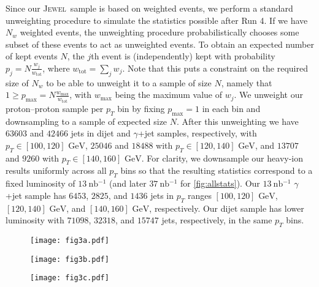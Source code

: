 \documentclass[aps,prl,twocolumn,preprintnumbers,showpacs,floatfix,nofootinbib]{revtex4-1}
\newcommand*{\jewel}{\textsc{Jewel}}
\begin{document}
Since our \jewel\ sample is based on weighted events, we perform a standard unweighting procedure to simulate the statistics possible after Run 4.
%
If we have $N_w$ weighted events, the unweighting procedure probabilistically chooses some subset of these events to act as unweighted events.
%
To obtain an expected number of kept events $N$, the $j$th event is (independently) kept with probability $p_j = N \frac{w_j}{w_\text{tot}}$, where $w_\text{tot} = \sum_j w_j$.
%
Note that this puts a constraint on the required size of $N_w$ to be able to unweight it to a sample of size $N$, namely that $1 \ge p_\text{max} = N \frac{w_\text{max}}{w_\text{tot}}$, with $w_\text{max}$ being the maximum value of $w_j$.
%
We unweight our proton--proton sample per $p_T$ bin by fixing $p_\text{max}=1$ in each bin and downsampling to a sample of expected size $N$.
%
After this unweighting we have $63603$ and $42466$ jets in dijet and $\gamma$+jet samples, respectively, with $p_T \in [100,120] \text{ GeV}$, $25046$ and $18488$ with $p_T \in [120,140] \text{ GeV}$, and $13707$ and $9260$ with $p_T \in [140,160] \text{ GeV}$.
%
For clarity, we downsample our heavy-ion results uniformly across all $p_T$ bins so that the resulting statistics correspond to a fixed luminosity of $\SI{13}{\nano\barn^{-1}}$ (and later $\SI{37}{\nano\barn^{-1}}$ for \cref{fig:allstats}).
%
Our $\SI{13}{\nano\barn^{-1}}$ $\gamma$+jet sample has $6453$, $2825$, and $1436$ jets in $p_T$ ranges $[100,120] \text{ GeV}$, $[120,140] \text{ GeV}$, and $[140,160] \text{ GeV}$, respectively.
%
Our dijet sample has lower luminosity with $71098$, $32318$, and $15747$ jets, respectively, in the same $p_T$ bins.

\begin{figure*}
\begin{subfigure}[b]{0.31\linewidth}
	\centering
	\texttt{[image: fig3a.pdf]}
	\caption{}
	\label{fig:dists_allstats}
\end{subfigure}
\begin{subfigure}[b]{0.31\linewidth}
	\centering
	\texttt{[image: fig3b.pdf]}
	\caption{}
	\label{fig:topics_allstats}
\end{subfigure}
\begin{subfigure}[b]{0.31\linewidth}
	\centering
	\texttt{[image: fig3c.pdf]}
	\caption{}
	\label{fig:fracs_allstats}
\end{subfigure}
\caption{Same as the bottom row of \cref{fig:topics}, but using a factor of about $2.8$ higher $\gamma+\text{jet}$ statistics than expected after LHC Run 4.
%
With more events, the agreement of the distribution of the quark-like topic (purple) relative to the MC-level definition (black) is somewhat improved compared to \cref{fig:topics_HI}, though the gluon-like topic fraction remains high compared to the MC label fraction.
%
}
\label{fig:allstats}
\end{figure*}
\end{document}
